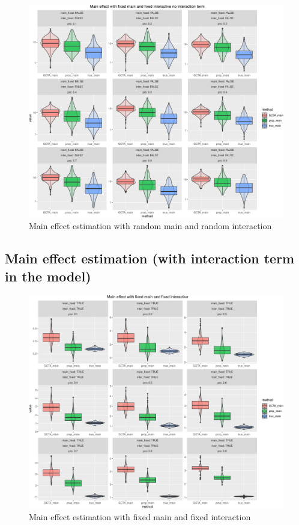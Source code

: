 \documentclass[]{article}
\begin{document}
\begin{figure}
\centering
\includegraphics{Simulation_report_files/figure-latex/main effect random random without inter-1.pdf}
\caption{Main effect estimation with random main and random interaction}
\end{figure}

\newpage 

\subsection{Main effect estimation (with interaction term in the
model)}\label{main-effect-estimation-with-interaction-term-in-the-model}

\begin{figure}
\centering
\includegraphics{Simulation_report_files/figure-latex/main effect fixed fixed-1.pdf}
\caption{Main effect estimation with fixed main and fixed interaction}
\end{figure}
\end{document}
